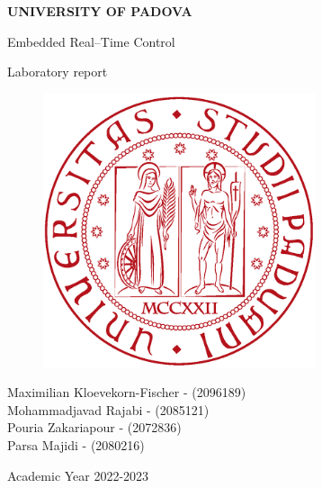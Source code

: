 \documentclass[english]{article}
\begin{document}
\setcounter{section}{-1} %
\begin{titlepage}

	\begin{center}
		\begin{Large} \textbf{UNIVERSITY OF PADOVA} \\
		\end{Large} \vspace{1cm}
		\vspace{3cm}
		\begin{Large} Embedded Real--Time Control \end{Large}
		\par\end{center}

	\begin{center}
		\begin{Large}Laboratory report\\
		\end{Large}
		\par\end{center}

	\begin{center}
		\vspace{2cm}
		\begin{figure}[!htb]
			\centering \includegraphics[width=8cm]{figures/unipd-logo.png}\\

		\end{figure}

		\par\end{center}

	\begin{center}
		\vspace{2cm}
		\begin{Large} 
                Maximilian Kloevekorn-Fischer - (2096189) \\
                Mohammadjavad Rajabi - (2085121) \\
                Pouria Zakariapour - (2072836) \\
                Parsa Majidi - (2080216)  \\
		\end{Large} \vspace{2cm}
		\begin{Large} Academic Year 2022-2023 \end{Large}
		\par\end{center}


\end{titlepage}
\end{document}
